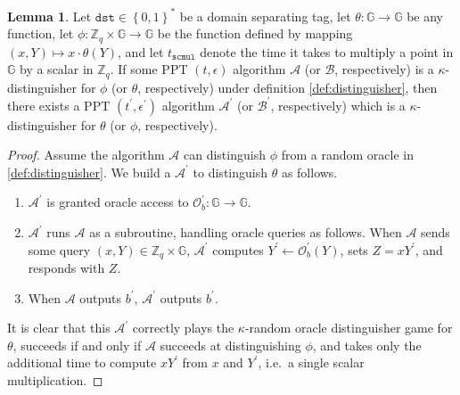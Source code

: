 \documentclass[11pt]{article}
\theoremstyle{definition}
\newtheorem{lemma}[lemma]{Lemma}
\newcommand{\G}{\mathbb{G}}
\newcommand{\dst}{\texttt{dst}}
\newcommand{\bitstrings}{\left\{0,1\right\}^*}
\newcommand{\Zq}{\mathbb{Z}_q}
\begin{document}
\begin{lemma}\label{lem:link_tags_are_oracles}
Let  $\dst \in \bitstrings$ be a domain separating tag, let $\theta:\G \to \G$ be any function, let $\phi: \Zq \times \G \to \G$ be the function defined by mapping $(x, Y) \mapsto x \cdot \theta(Y)$, and let $t_{\texttt{scmul}}$ denote the time it takes to multiply a point in $\G$ by a scalar in $\Zq$. If some PPT $(t,\epsilon)$ algorithm $\mathcal{A}$ (or $\mathcal{B}$, respectively) is a $\kappa$-distinguisher for $\phi$ (or $\theta$, respectively) under definition \cref{def:distinguisher}, then there exists a PPT $(t^\prime, \epsilon^\prime)$ algorithm $\mathcal{A}^\prime$ (or $\mathcal{B}^\prime$, respectively) which is a $\kappa$-distinguisher for $\theta$ (or $\phi$, respectively).
\end{lemma}
\begin{proof}
Assume the algorithm $\mathcal{A}$ can distinguish $\phi$ from a random oracle in \cref{def:distinguisher}. We build a $\mathcal{A}^\prime$ to distinguish $\theta$ as follows.
\begin{enumerate}
\item $\mathcal{A}^\prime$ is granted oracle access to $\mathcal{O}^\prime_b:\G \to \G$.
\item $\mathcal{A}^\prime$ runs $\mathcal{A}$ as a subroutine, handling oracle queries as follows. When $\mathcal{A}$ sends some query $(x, Y) \in \Zq \times \G$, $\mathcal{A}^\prime$ computes $Y^\prime \leftarrow \mathcal{O}^\prime_b(Y)$, sets $Z = xY^\prime$, and responds with $Z$.
\item When $\mathcal{A}$ outputs $b^\prime$, $\mathcal{A}^\prime$ outputs $b^\prime$.
\end{enumerate}
It is clear that this $\mathcal{A}^\prime$ correctly plays the $\kappa$-random oracle distinguisher game for $\theta$, succeeds if and only if $\mathcal{A}$ succeeds at distinguishing $\phi$, and takes only the additional time to compute $xY^\prime$ from $x$ and $Y^\prime$, i.e.\ a single scalar multiplication.


\end{proof}
\end{document}
